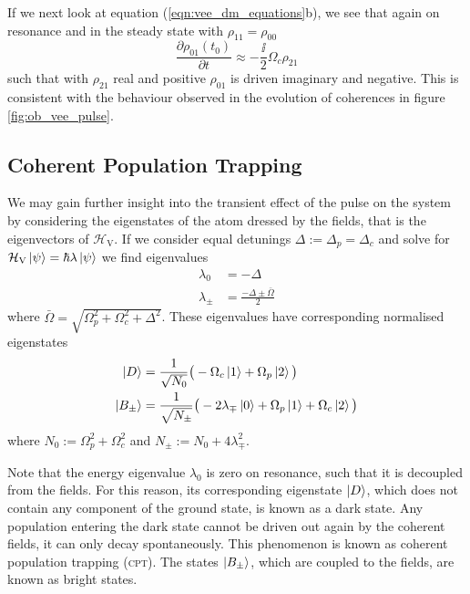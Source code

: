     If we next look at equation (\ref{eqn:vee_dm_equations}b), we see that again
    on resonance and in the steady state with $\rho_{11} = \rho_{00}$
    \begin{equation}
       \frac{\partial \rho_{01}(t_{0})}{\partial t} \approx -\frac{\ii}{2} 
        \Omega_c \rho_{21}
      \label{eqn:rho01}
    \end{equation}
    such that with $\rho_{21}$ real and positive $\rho_{01}$ is driven imaginary
    and negative. This is consistent with the behaviour observed in the
    evolution of coherences in figure \ref{fig:ob_vee_pulse}.

  \subsection{Coherent Population Trapping}

    We may gain further insight into the transient effect of the pulse on the
    system by considering the eigenstates of the atom dressed by the fields,
    that is the eigenvectors of $\mathcal{H}_\mathrm{V}$.\cite{lambropoulos2007fundamentals, Blok1990} If we consider equal
    detunings $\Delta := \Delta_p = \Delta_c$ and solve for
    $\mathcal{H}_\mathrm{V} \Ket{\psi} = \hbar \lambda \Ket{\psi}$ we find
    eigenvalues
    \begin{subequations}
      \begin{align}
      \lambda_0 &= -\Delta \\
      \lambda_\pm &= \frac{-\Delta \pm \bar{\Omega}}{2}
      \end{align}
      \label{eqn:vee_eigvals}
    \end{subequations}
    where $\bar{\Omega}= \sqrt{\Omega_p^2 + \Omega_c^2 + \Delta^2}$. These
    eigenvalues have corresponding normalised eigenstates
    \begin{subequations}
      \begin{align}
      \Ket{D} &= \frac{1}{\sqrt{N_0}} \big( -\Omega_c \Ket{1} + \Omega_p 
      \Ket{2} \big) \\
      \Ket{B_\pm} &= \frac{1}{\sqrt{N_\pm}} \big(-2 \lambda_\mp \Ket{0} + 
      \Omega_p \Ket{1} + \Omega_c \Ket{2} \big)
      \end{align}
      \label{eqn:vee_eigvects}
    \end{subequations}
    where $N_0 := \Omega_p^2 + \Omega_c^2$ and $N_\pm := N_0 + 4 \lambda_\mp^2$.

    Note that the energy eigenvalue $\lambda_0$ is zero on resonance, such that
    it is decoupled from the fields. For this reason, its corresponding
    eigenstate $\Ket{D}$, which does not contain any component of the ground
    state, is known as a dark state. Any population entering the dark state
    cannot be driven out again by the coherent fields, it can only decay
    spontaneously. This phenomenon is known as coherent population trapping
    (\textsc{cpt}).\cite{Fleischhauer2005} The states $\Ket{B_\pm}$, which are
    coupled to the fields, are known as bright states.


